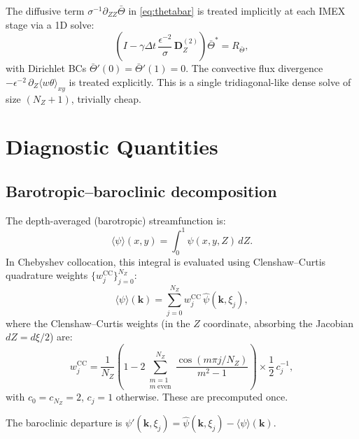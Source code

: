 \documentclass[11pt]{article}
\newcommand{\avg}[1]{\langle #1 \rangle}
\newcommand{\hhat}[1]{\widehat{#1}}
\newcommand{\Dvec}{\bm{D}}
\begin{document}
The diffusive term $\sigma^{-1}\partial_{ZZ}\bar\Theta$ in \eqref{eq:thetabar} is treated implicitly at each IMEX stage via a 1D solve:
\begin{equation}
\left(I - \gamma\Delta t\,\frac{\epsilon^{-2}}{\sigma}\,\Dvec_Z^{(2)}\right)\bar\Theta^{*} = R_{\bar\Theta},
\end{equation}
with Dirichlet BCs $\bar\Theta'(0) = \bar\Theta'(1) = 0$. The convective flux divergence $-\epsilon^{-2}\,\partial_Z\avg{w\theta}_{xy}$ is treated explicitly. This is a single tridiagonal-like dense solve of size $(N_Z+1)$, trivially cheap.


\section{Diagnostic Quantities}
\label{sec:diagnostics}

\subsection{Barotropic--baroclinic decomposition}

The depth-averaged (barotropic) streamfunction is:
\begin{equation}
\avg{\psi}(x,y) = \int_0^1 \psi(x,y,Z)\,dZ.
\end{equation}
In Chebyshev collocation, this integral is evaluated using Clenshaw--Curtis quadrature weights $\{w^{\mathrm{CC}}_j\}_{j=0}^{N_Z}$:
\begin{equation}
\avg{\psi}(\bm{k}) = \sum_{j=0}^{N_Z} w^{\mathrm{CC}}_j\, \hhat\psi(\bm{k}, \xi_j),
\label{eq:bt_avg}
\end{equation}
where the Clenshaw--Curtis weights (in the $Z$ coordinate, absorbing the Jacobian $dZ = d\xi/2$) are:
\begin{equation}
w^{\mathrm{CC}}_j = \frac{1}{N_Z}\left(1 - 2\sum_{\substack{m=1 \\ m\;\text{even}}}^{N_Z} \frac{\cos(m\pi j/N_Z)}{m^2 - 1}\right) \times \frac{1}{2}\,c_j^{-1},
\end{equation}
with $c_0 = c_{N_Z} = 2$, $c_j = 1$ otherwise. These are precomputed once.

The baroclinic departure is $\psi'(\bm{k}, \xi_j) = \hhat\psi(\bm{k}, \xi_j) - \avg{\psi}(\bm{k})$.

\end{document}
